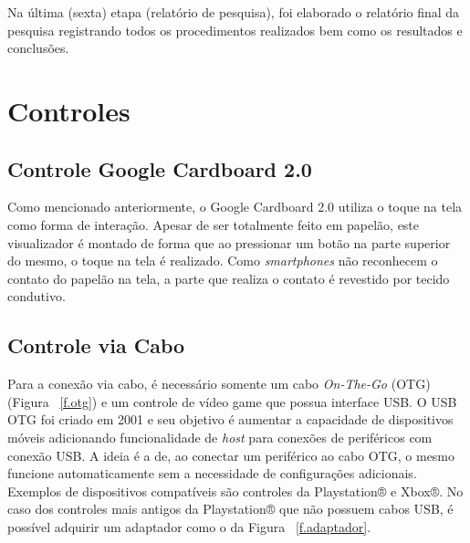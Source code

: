 Na última (sexta) etapa (relatório de pesquisa), foi elaborado o relatório final da pesquisa registrando todos os procedimentos realizados bem como os resultados e conclusões.

\section{Controles}

\subsection{Controle Google Cardboard 2.0}
\label{ss.cardboard}

Como mencionado anteriormente, o Google Cardboard 2.0 utiliza o toque na tela como forma de interação. Apesar de ser totalmente feito em papelão, este visualizador é montado de forma que ao pressionar um botão na parte superior do mesmo, o toque na tela é realizado. Como \textit{smartphones} não reconhecem o contato do papelão na tela, a parte que realiza o contato é revestido por tecido condutivo.

\subsection{Controle via Cabo}
\label{ss.cabo}

Para a conexão via cabo, é necessário somente um cabo \textit{On-The-Go} (OTG) (Figura ~\ref{f.otg}) e um controle de vídeo game que possua interface USB. O USB OTG foi criado em 2001 e seu objetivo é aumentar a capacidade de dispositivos móveis adicionando funcionalidade de \textit{host} para conexões de periféricos com conexão USB. A ideia é a de, ao conectar um periférico ao cabo OTG, o mesmo funcione automaticamente sem a necessidade de configurações adicionais. \cite{otg}
Exemplos de dispositivos compatíveis são controles da Playstation® e Xbox®. No caso dos controles mais antigos da Playstation® que não possuem cabos USB, é possível adquirir um adaptador como o da Figura ~\ref{f.adaptador}.

